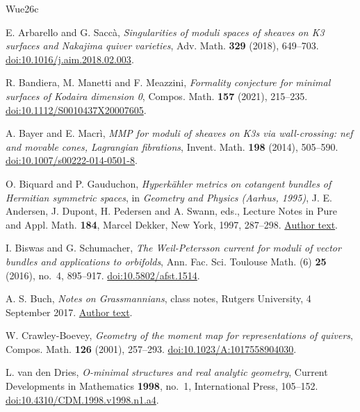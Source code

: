 \begin{thebibliography}{Wue26c}

E. Arbarello and G. Sacc\`a,
\emph{Singularities of moduli spaces of sheaves on K3 surfaces and
Nakajima quiver varieties}, Adv. Math. \textbf{329} (2018), 649--703.
\href{https://doi.org/10.1016/j.aim.2018.02.003}{doi:10.1016/j.aim.2018.02.003}.

R. Bandiera, M. Manetti and F. Meazzini,
\emph{Formality conjecture for minimal surfaces of Kodaira dimension 0},
Compos. Math. \textbf{157} (2021), 215--235.
\href{https://doi.org/10.1112/S0010437X20007605}{doi:10.1112/S0010437X20007605}.

A. Bayer and E. Macr\`i,
\emph{MMP for moduli of sheaves on K3s via wall-crossing: nef and
movable cones, Lagrangian fibrations}, Invent. Math. \textbf{198}
(2014), 505--590.
\href{https://doi.org/10.1007/s00222-014-0501-8}{doi:10.1007/s00222-014-0501-8}.

O. Biquard and P. Gauduchon,
\emph{Hyperkähler metrics on cotangent bundles of Hermitian symmetric spaces},
in \emph{Geometry and Physics (Aarhus, 1995)},
J. E. Andersen, J. Dupont, H. Pedersen and A. Swann, eds.,
Lecture Notes in Pure and Appl. Math. \textbf{184},
Marcel Dekker, New York, 1997, 287--298.
\href{https://webusers.imj-prg.fr/~olivier.biquard/hs.pdf}{Author text}.

I. Biswas and G. Schumacher,
\emph{The Weil-Petersson current for moduli of vector bundles and
applications to orbifolds}, Ann. Fac. Sci. Toulouse Math. (6)
\textbf{25} (2016), no.~4, 895--917.
\href{https://doi.org/10.5802/afst.1514}{doi:10.5802/afst.1514}.

A. S. Buch,
\emph{Notes on Grassmannians}, class notes, Rutgers University,
4 September 2017.
\href{https://sites.math.rutgers.edu/~asbuch/notes/grass.pdf}{Author text}.

W. Crawley-Boevey,
\emph{Geometry of the moment map for representations of quivers},
Compos. Math. \textbf{126} (2001), 257--293.
\href{https://doi.org/10.1023/A:1017558904030}{doi:10.1023/A:1017558904030}.

L. van den Dries,
\emph{O-minimal structures and real analytic geometry},
Current Developments in Mathematics \textbf{1998}, no.~1,
International Press, 105--152.
\href{https://doi.org/10.4310/CDM.1998.v1998.n1.a4}{doi:10.4310/CDM.1998.v1998.n1.a4}.


\end{thebibliography}
